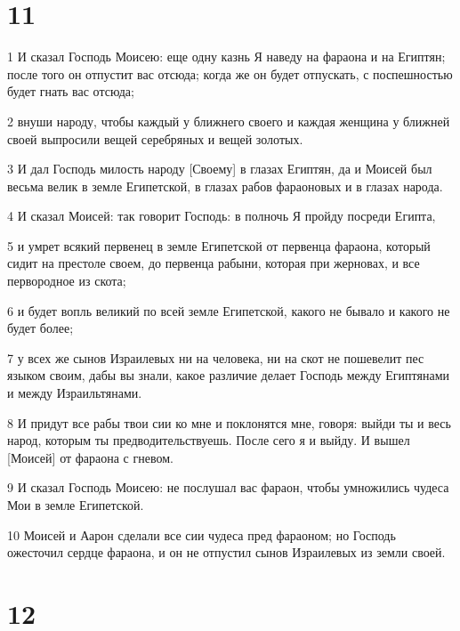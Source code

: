 \chapter{11}

\par 1 И сказал Господь Моисею: еще одну казнь Я наведу на фараона и на Египтян; после того он отпустит вас отсюда; когда же он будет отпускать, с поспешностью будет гнать вас отсюда;
\par 2 внуши народу, чтобы каждый у ближнего своего и каждая женщина у ближней своей выпросили вещей серебряных и вещей золотых.
\par 3 И дал Господь милость народу [Своему] в глазах Египтян, да и Моисей был весьма велик в земле Египетской, в глазах рабов фараоновых и в глазах народа.
\par 4 И сказал Моисей: так говорит Господь: в полночь Я пройду посреди Египта,
\par 5 и умрет всякий первенец в земле Египетской от первенца фараона, который сидит на престоле своем, до первенца рабыни, которая при жерновах, и все первородное из скота;
\par 6 и будет вопль великий по всей земле Египетской, какого не бывало и какого не будет более;
\par 7 у всех же сынов Израилевых ни на человека, ни на скот не пошевелит пес языком своим, дабы вы знали, какое различие делает Господь между Египтянами и между Израильтянами.
\par 8 И придут все рабы твои сии ко мне и поклонятся мне, говоря: выйди ты и весь народ, которым ты предводительствуешь. После сего я и выйду. И вышел [Моисей] от фараона с гневом.
\par 9 И сказал Господь Моисею: не послушал вас фараон, чтобы умножились чудеса Мои в земле Египетской.
\par 10 Моисей и Аарон сделали все сии чудеса пред фараоном; но Господь ожесточил сердце фараона, и он не отпустил сынов Израилевых из земли своей.

\chapter{12}

